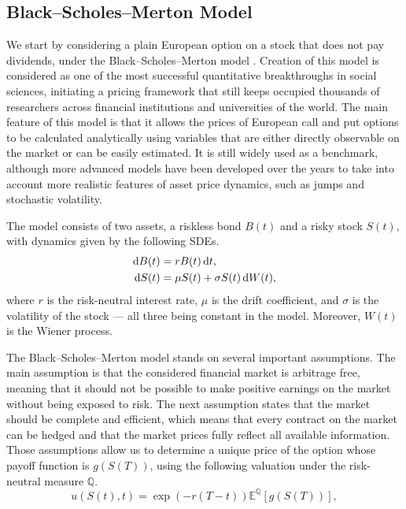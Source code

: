 \documentclass{UUThesisTemplate}
\begin{document}
\subsection{Black--Scholes--Merton Model}
\label{sub:bs}
\par We start by considering a plain European option on a stock that does not pay dividends, under the Black--Scholes--Merton model \cite{black73,merton73}. Creation of this model is considered as one of the most successful quantitative breakthroughs in social sciences, initiating a pricing framework that still keeps occupied thousands of researchers across financial institutions and universities of the world. The main feature of this model is that it allows the prices of European call and put options to be calculated analytically using variables that are either directly observable on the market or can be easily estimated. It is still widely used as a benchmark, although more advanced models have been developed over the years to take into account more realistic features of asset price dynamics, such as jumps and stochastic volatility.
\par The model consists of two assets, a riskless bond $B(t)$ and a risky stock $S(t)$, with dynamics given by the following SDEs.
\begin{align}
\dif B(t) &= r B(t) \dif t, \label{eq:bond} \\
\dif S(t) &= \mu S(t) + \sigma S(t) \dif W(t), \label{eq:stock}
\end{align}
where $r$ is the risk-neutral interest rate, $\mu$ is the drift coefficient, and $\sigma$ is the volatility of the stock --- all three being constant in the model. Moreover, $W(t)$ is the Wiener process.
\par The Black--Scholes--Merton model stands on several important assumptions. The main assumption is that the considered financial market is arbitrage free, meaning that it should not be possible to make positive earnings on the market without being exposed to risk. The next assumption states that the market should be complete and efficient, which means that every contract on the market can be hedged and that the market prices fully reflect all available information. Those assumptions allow us to determine a unique price of the option whose payoff function is $g(S(T))$, using the following valuation under the risk-neutral measure $\mathbb{Q}$.
\begin{equation}
\label{eq:mc}
u(S(t),t)=\exp\left(-r(T-t)\right)\mathbb{E}^{\mathbb{Q}}\left[g(S(T))\right],
\end{equation}
\end{document}
